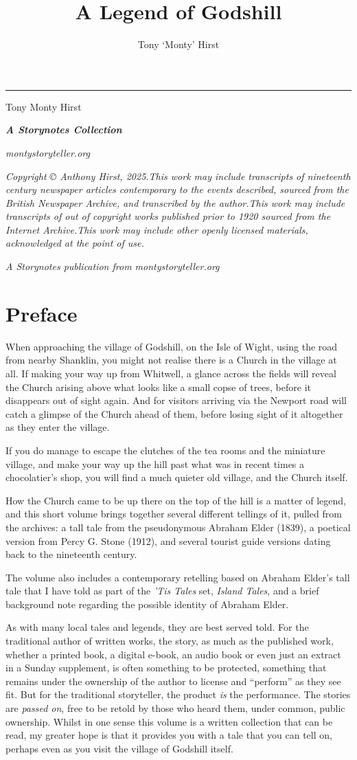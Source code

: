 \documentclass[
  12pt,
  a5paper,
  twoside]{book}
\date{}
\title{A Legend of Godshill}
\author{Tony `Monty' Hirst}
\date{}
\makeatletter
\let\origtableofcontents\tableofcontents
\renewcommand{\tableofcontents}{%
    \cleardoublepage
    \pagestyle{plain}
    \origtableofcontents
    \cleardoublepage
    \pagestyle{normal} 
  }
\renewcommand{\maketitle}{%
  \thispagestyle{plain}
  \noindent\rule{\linewidth}{1pt}\par
  \begingroup
    \hypersetup{pdfauthor={\@author}, pdftitle={\@title}}%
  \endgroup
  \begin{flushright}
    \vspace{48pt}
    {\headingfont
    {\fontsize{44pt}{56pt}\selectfont \setlength{\baselineskip}{56pt}%
    \@title\par}
    \vspace{96pt}
    {\Large Tony {\textquotesingle}Monty{\textquotesingle} Hirst}\par
    
    \vspace{25pt}
    \@date \par

    }
  \end{flushright}

  \newpage
  \thispagestyle{plain}
  \thispagestyle{empty}

  \makeatletter

  \vspace*{\fill}

  \begin{center}
  {\large \textbf{\textit{A Storynotes Collection}}}\\[2em]
  \end{center}

  \vfill

  \begin{center}
  \large \textit{montystoryteller.org}
  \end{center}

  \vspace{2cm}

  \begin{center}
  \textit{Copyright {\copyright} Anthony Hirst, 2025.\linebreak\linebreak This work may include transcripts of nineteenth century newspaper articles contemporary to the events described, sourced from the British Newspaper Archive, and transcribed by the author.\linebreak\linebreak This work may include transcripts of out of copyright works published prior to 1920 sourced from the Internet Archive.\linebreak\linebreak This work may include other openly licensed materials, acknowledged at the point of use.
  }
  \end{center}

  \vspace*{\fill}

  \begin{center}
    \textit{A Storynotes publication from montystoryteller.org}
  \end{center}
  \makeatother

  \setcounter{footnote}{0}
  \let\thanks\relax\let\maketitle\relax
}
\renewcommand*\contentsname{Table of contents}
\newcommand\contentsname{Table of contents}
\makeatother
\begin{document}
\frontmatter
\maketitle

\renewcommand*\contentsname{Contents}
{
\setcounter{tocdepth}{0}
\tableofcontents
}

\mainmatter
{}

\chapter{Preface}\label{preface}

When approaching the village of Godshill, on the Isle of Wight, using
the road from nearby Shanklin, you might not realise there is a Church
in the village at all. If making your way up from Whitwell, a glance
across the fields will reveal the Church arising above what looks like a
small copse of trees, before it disappears out of sight again. And for
visitors arriving via the Newport road will catch a glimpse of the
Church ahead of them, before losing sight of it altogether as they enter
the village.

If you do manage to escape the clutches of the tea rooms and the
miniature village, and make your way up the hill past what was in recent
times a chocolatier's shop, you will find a much quieter old village,
and the Church itself.

How the Church came to be up there on the top of the hill is a matter of
legend, and this short volume brings together several different tellings
of it, pulled from the archives: a tall tale from the pseudonymous
Abraham Elder (1839), a poetical version from Percy G. Stone (1912), and
several tourist guide versions dating back to the nineteenth century.

The volume also includes a contemporary retelling based on Abraham
Elder's tall tale that I have told as part of the \emph{'Tis Tales} set,
\emph{Island Tales}, and a brief background note regarding the possible
identity of Abraham Elder.

As with many local tales and legends, they are best served told. For the
traditional author of written works, the story, as much as the published
work, whether a printed book, a digital e-book, an audio book or even
just an extract in a Sunday supplement, is often something to be
protected, something that remains under the ownership of the author to
license and ``perform'' as they see fit. But for the traditional
storyteller, the product \emph{is} the performance. The stories are
\emph{passed on}, free to be retold by those who heard them, under
common, public ownership. Whilst in one sense this volume is a written
collection that can be read, my greater hope is that it provides you
with a tale that you can tell on, perhaps even as you visit the village
of Godshill itself.
\end{document}
